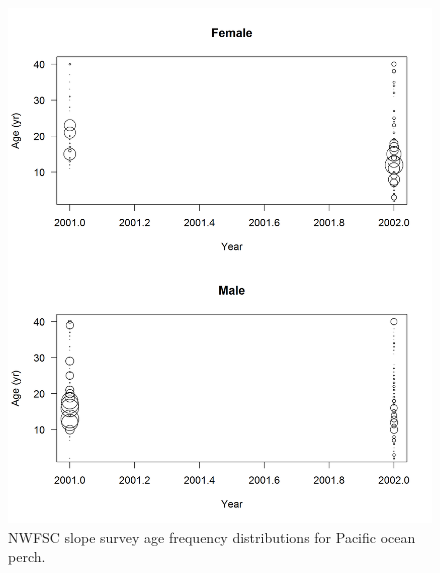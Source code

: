 \documentclass[12pt,]{article}
\begin{document}
\begin{figure}
\centering
\includegraphics{Figures/NWslope_Ages.png}
\caption{NWFSC slope survey age frequency distributions for Pacific
ocean perch. \label{fig:nw_slope_Age}}
\end{figure}
\end{document}
